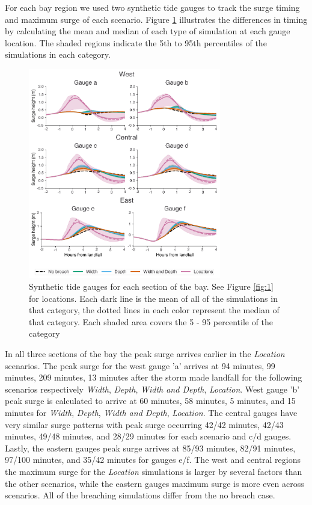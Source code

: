 \documentclass{coastal_paper}
\begin{document}
For each bay region we used two synthetic tide gauges to track the surge timing and maximum surge of each scenario. Figure \ref{fig:4} illustrates the differences in timing by calculating the mean and median of each type of simulation at each gauge location. The shaded regions indicate the 5th to 95th percentiles of the simulations in each category.
\begin{figure}[ht]
    \centering
    \includegraphics[width=0.75\textwidth]{figures/fig4_v2.pdf}
    \caption{Synthetic tide gauges for each section of the bay. See Figure \ref{fig:1} for locations. Each dark line is the mean of all of the simulations in that category, the dotted lines in each color represent the median of that category. Each shaded area covers the 5 - 95 percentile of the category}
    \label{fig:4}
\end{figure}

In all three sections of the bay the peak surge arrives earlier in the \emph{Location} scenarios. The peak surge for the west gauge 'a' arrives at  94 minutes, 99 minutes, 209 minutes, 13 minutes after the storm made landfall for the following scenarios respectively \emph{Width}, \emph{Depth}, \emph{Width and Depth}, \emph{Location}. West gauge 'b' peak surge is calculated to arrive at 60 minutes, 58 minutes, 5 minutes, and 15 minutes for \emph{Width}, \emph{Depth}, \emph{Width and Depth}, \emph{Location}. The central gauges have very similar surge patterns with peak surge occurring 42/42 minutes, 42/43 minutes, 49/48 minutes, and 28/29 minutes for each scenario and c/d gauges. Lastly, the eastern gauges peak surge arrives at 85/93 minutes, 82/91 minutes, 97/100 minutes, and 35/42 minutes for gauges e/f. The west and central regions the maximum surge for the \emph{Location} simulations is larger by several factors than the other scenarios, while the eastern gauges maximum surge is more even across scenarios. All of the breaching simulations differ from the no breach case.
\end{document}
